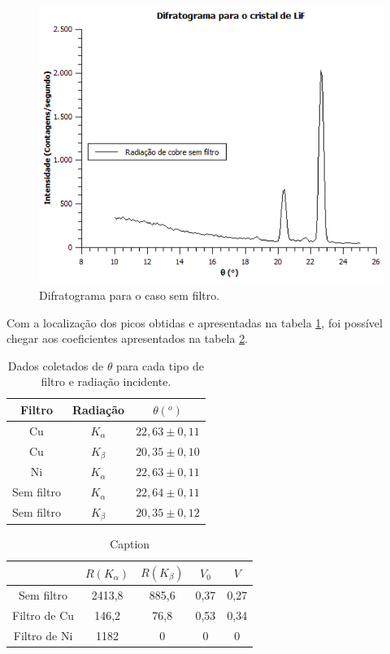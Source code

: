 \documentclass[article,12pt,openright,oneside,a4paper,brazil]{abntex2}
\begin{document}
\begin{figure}[H]
    \centering
    \includegraphics[scale=0.8]{Figuras/Semfiltro.png}
    \caption{Difratograma para o caso sem filtro.}
    \label{fig:semfiltro}
\end{figure}

Com a localização dos picos obtidas e apresentadas na tabela \ref{tab:filtrotheta}, foi possível chegar aos coeficientes apresentados na tabela \ref{tab:filtror}.

\begin{table}[H]
    \centering
    \caption{Dados coletados de $\theta$ para cada tipo de filtro e radiação incidente.}
    \begin{tabular}{|c|c|c|}
        \hline
        Filtro & Radiação & $\theta(^o)$ \\ \hline
        Cu & $K_\alpha$ & $22,63\pm0,11$ \\ \hline
        Cu & $K_\beta$ & $20,35\pm0,10$ \\ \hline
        Ni & $K_\alpha$ & $22,63\pm0,11$ \\ \hline
        Sem filtro & $K_\alpha$ & $22,64\pm0,11$ \\ \hline
        Sem filtro & $K_\beta$ & $20,35\pm0,12$ \\ \hline
    \end{tabular}
    \label{tab:filtrotheta}
\end{table}

\begin{table}[H]
    \centering
    \caption{Caption}
    \begin{tabular}{|c|c|c|c|c|}
    \hline
         & $R(K_\alpha)$ & $R(K_\beta)$ & $V_0$ & $V$ \\ \hline
        Sem filtro & 2413,8 & 885,6 & 0,37 & 0,27 \\ \hline
        Filtro de Cu & 146,2 & 76,8 & 0,53 & 0,34 \\ \hline
        Filtro de Ni & 1182 & 0 & 0 & 0 \\ \hline 
    \end{tabular}
    \label{tab:filtror}
\end{table}
\end{document}
